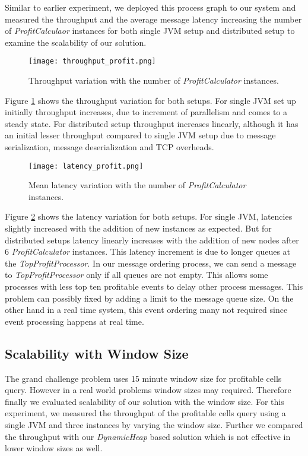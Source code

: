 Similar to earlier experiment,  we deployed this process graph to our system and measured the throughput and the average message latency increasing the number of  \textit{ProfitCalculaor} instances for both single JVM setup and distributed setup to examine the scalability of our solution.

\begin{figure}[!t]
        \centering
        \texttt{[image: throughput\_profit.png]}
        \caption{Throughput variation with the number of \textit{ProfitCalculator} instances.}
        \label{throughput_profit}
\end{figure}
 
Figure \ref{throughput_profit} shows the throughput variation for both setups. For single JVM set up initially throughput increases, due to increment of parallelism and comes to a steady state. For distributed setup  throughput increases linearly, although it has an initial lesser throughput compared to single JVM setup due to message serialization, message deserialization and TCP overheads. 

\begin{figure}[!t]
        \centering
        \texttt{[image: latency\_profit.png]}
        \caption{Mean latency variation with the number of \textit{ProfitCalculator} instances.}
        \label{latency_profit}
\end{figure}

Figure \ref{latency_profit} shows the latency variation for both setups. For single JVM, latencies slightly increased with the addition of new instances as expected. But for distributed setups latency linearly increases with the addition of new nodes after 6 \textit{ProfitCalculator} instances. This latency increment is due to longer queues at the \textit{TopProfitProcessor}. In our message ordering process, we can send a message to \textit{TopProfitProcessor} only if all queues are not empty. This allows some processes with less top ten profitable events to delay other process messages. This problem can  possibly fixed by adding a limit to the message queue size. On the other hand in a real time system, this event ordering many not required since event processing happens at real time.

\subsection{Scalability with Window Size}

The grand challenge problem uses 15 minute window size for profitable cells query. However in a real world problems window sizes may required. Therefore finally we evaluated scalability of our solution with the window size.  For this experiment, we measured the throughput of the profitable cells query using a single JVM and three instances by varying the window size. Further we compared the throughput with our \textit{DynamicHeap} based solution which is not effective in lower window sizes as well.

